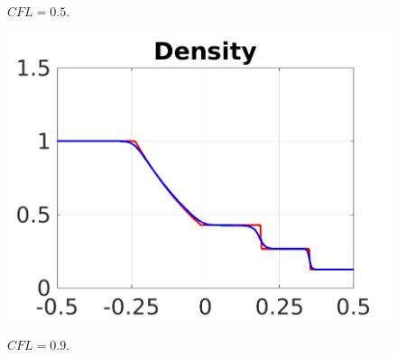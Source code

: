 \begin{questions}
\begin{solution}
\begin{figure}[H]
\caption{$CFL= 0.5$.}
\end{figure}
\begin{figure}[H]
\centering     %
{\includegraphics[scale=0.5]{density_r09.png}}
\caption{$CFL= 0.9$.}
\end{figure}
\end{solution}
\end{questions}
